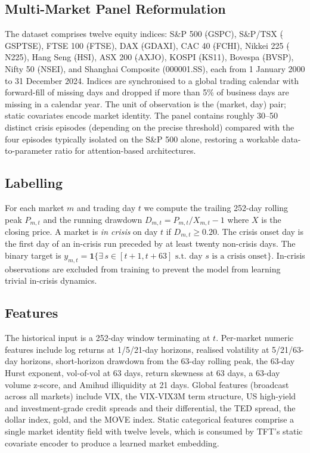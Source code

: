 \documentclass[11pt,a4paper]{article}
\begin{document}
\subsection{Multi-Market Panel Reformulation}
The dataset comprises twelve equity indices: S\&P 500 ($\hat{}$GSPC),
S\&P/TSX ($\hat{}$GSPTSE), FTSE 100 ($\hat{}$FTSE), DAX ($\hat{}$GDAXI),
CAC 40 ($\hat{}$FCHI), Nikkei 225 ($\hat{}$N225), Hang Seng
($\hat{}$HSI), ASX 200 ($\hat{}$AXJO), KOSPI ($\hat{}$KS11), Bovespa
($\hat{}$BVSP), Nifty 50 ($\hat{}$NSEI), and Shanghai Composite
(000001.SS), each from 1 January 2000 to 31 December 2024. Indices are
synchronised to a global trading calendar with forward-fill of missing days
and dropped if more than 5\% of business days are missing in a calendar
year. The unit of observation is the (market, day) pair; static covariates
encode market identity. The panel contains roughly 30--50 distinct crisis
episodes (depending on the precise threshold) compared with the four
episodes typically isolated on the S\&P 500 alone, restoring a workable
data-to-parameter ratio for attention-based architectures.

\subsection{Labelling}
For each market $m$ and trading day $t$ we compute the trailing 252-day
rolling peak $P_{m,t}$ and the running drawdown
$D_{m,t} = P_{m,t}/X_{m,t} - 1$ where $X$ is the closing price. A market is
\emph{in crisis} on day $t$ if $D_{m,t} \geq 0.20$. The crisis onset day
is the first day of an in-crisis run preceded by at least twenty
non-crisis days. The binary target is
\(
y_{m,t} = \mathbf{1}\{\exists\,s \in [t+1, t+63]\text{ s.t. day $s$ is a crisis onset}\}.
\)
In-crisis observations are excluded from training to prevent the model from
learning trivial in-crisis dynamics.

\subsection{Features}
The historical input is a 252-day window terminating at $t$. Per-market
numeric features include log returns at 1/5/21-day horizons, realised
volatility at 5/21/63-day horizons, short-horizon drawdown from the 63-day
rolling peak, the 63-day Hurst exponent, vol-of-vol at 63 days, return
skewness at 63 days, a 63-day volume z-score, and Amihud illiquidity at 21
days. Global features (broadcast across all markets) include VIX, the
VIX-VIX3M term structure, US high-yield and investment-grade credit
spreads and their differential, the TED spread, the dollar index, gold, and
the MOVE index. Static categorical features comprise a single market
identity field with twelve levels, which is consumed by TFT's static
covariate encoder to produce a learned market embedding.
\end{document}
